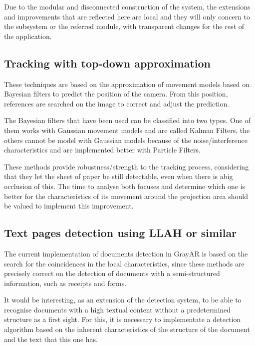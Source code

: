Due to the modular and disconnected construction of the system, the extensions and improvements that are reflected here are local and they will only concern to the subsystem or the referred module, with transparent changes for the
rest of the application.


\subsection{Tracking with top-down approximation}
These techniques are based on the approximation of movement models based on Bayesian filters to predict the position of the camera. From this position, references are searched on the image to correct and adjust the prediction. 

The Bayesian filters that have been used can be classified into two types. One of them works with Gaussian movement models and are called Kalman Filters, the others cannot be model with Gaussian models because of the noise/interference
characteristics and are implemented better with Particle Filters.

These methods provide robustness/strength to the tracking process, considering that they let the sheet of paper be still detectable, even when there is abig occlusion of this. The time to analyse both focuses and determine which one is
better for the characteristics of its movement around the projection area should be valued to implement this improvement.

\subsection{Text pages detection using LLAH or similar}
The current implementation of documents detection in GrayAR is based on the search for the coincidences in the local characteristics, since these methods are precisely correct on the detection of documents with a semi-structured information, such as receipts and forms.

It would be interesting, as an extension of the detection system, to be able to recognise documents with a high textual content without a predetermined structure as a first sight. For this, it is necessary to implementate a detection algorithm based on the inherent characteristics of the structure of the document and the text that this one has.

